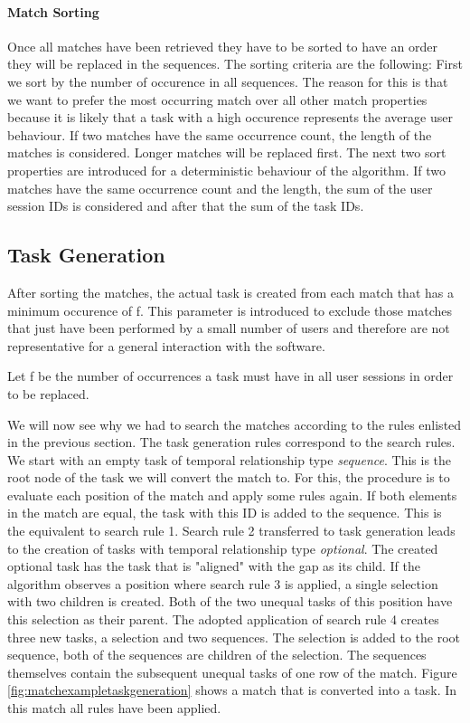 \paragraph{Match Sorting}
Once all matches have been retrieved they have to be sorted to have an order they will be replaced in the sequences. The sorting criteria are the following:
First we sort by the number of occurence in all sequences.
The reason for this is that we want to prefer the most occurring match over all other match properties because it is likely that a task with a high occurence represents
the average user behaviour. If two matches have the same occurrence count, the length of the matches is considered. Longer matches will be replaced first.
The next two sort properties are introduced for a deterministic behaviour of the algorithm.
If two matches have the same occurrence count and the length, the sum of the user session IDs is considered and after that the sum of the task IDs.


\subsection{Task Generation}
After sorting the matches, the actual task is created from each match that has a minimum occurence of f.
This parameter is introduced to exclude those matches that just have been performed by a small number of users and therefore are not representative for a general interaction with the software.
\begin{definition}
	\item Let f be the number of occurrences a task must have in all user sessions in order to be replaced.
		\label{def:minoccurrencecount}
\end{definition}
We will now see why we had to search the matches according to the rules enlisted in the previous section. The task generation rules correspond to the search rules.
We start with an empty task of temporal relationship type \textit{sequence}.
This is the root node of the task we will convert the match to.
For this, the procedure is to evaluate each position of the match and apply some rules again.
If both elements in the match are equal, the task with this ID is added to the sequence. This is the equivalent to search rule 1.
Search rule 2 transferred to task generation leads to the creation of tasks with temporal relationship type \textit{optional}.
The created optional task has the task that is "aligned" with the gap as its child.
If the algorithm observes a position where search rule 3 is applied, a single selection with two children is created.
Both of the two unequal tasks of this position have this selection as their parent.
The adopted application of search rule 4 creates three new tasks, a selection and two sequences.
The selection is added to the root sequence, both of the sequences are children of the selection.
The sequences themselves contain the subsequent unequal tasks of one row of the match.
Figure \ref{fig:matchexampletaskgeneration} shows a match that is converted into a task. In this match all rules have been applied.


